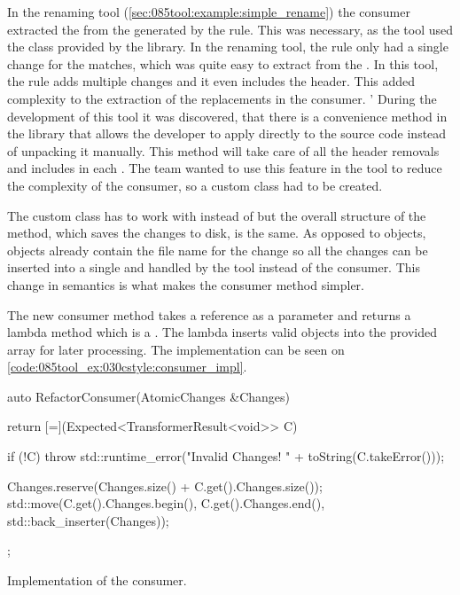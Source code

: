 In the renaming tool (\cref{sec:085tool:example:simple_rename}) the  consumer extracted the  from the  generated by the rule. This was necessary, as the tool used the  class provided by the library. In the renaming tool, the rule only had a single change for the matches, which was quite easy to extract from the . In this tool, the rule adds multiple changes and it even includes the  header. This added complexity to the extraction of the replacements in the consumer. 
'
During the development of this tool it was discovered, that there is a convenience method in the library that allows the developer to apply  directly to the source code instead of unpacking it manually. This method will take care of all the header removals and includes in each . The team wanted to use this feature in the tool to reduce the complexity of the consumer, so a custom  class had to be created.

The custom class has to work with  instead of  but the overall structure of the  method, which saves the changes to disk, is the same. As opposed to  objects, objects already contain the file name for the change so all the changes can be inserted into a single   and handled by the tool instead of the consumer. This change in semantics is what makes the consumer method simpler. 

The new consumer method takes a  reference as a parameter and returns a lambda method which is a . The lambda inserts valid  objects into the provided  array for later processing. The implementation can be seen on \cref{code:085tool_ex:030cstyle:consumer_impl}.

\begin{listing}[H]
    \begin{cppcode}
auto RefactorConsumer(AtomicChanges &Changes) {
        return [=](Expected<TransformerResult<void>> C) {
            if (!C) {
                throw std::runtime_error("Invalid Changes! " + toString(C.takeError()));
            }

            Changes.reserve(Changes.size() + C.get().Changes.size());
			std::move(C.get().Changes.begin(), C.get().Changes.end(),
			          std::back_inserter(Changes));
        };
}
    \end{cppcode}
    \caption{Implementation of the  consumer.}
    \label{code:085tool_ex:030cstyle:consumer_impl}
\end{listing}

